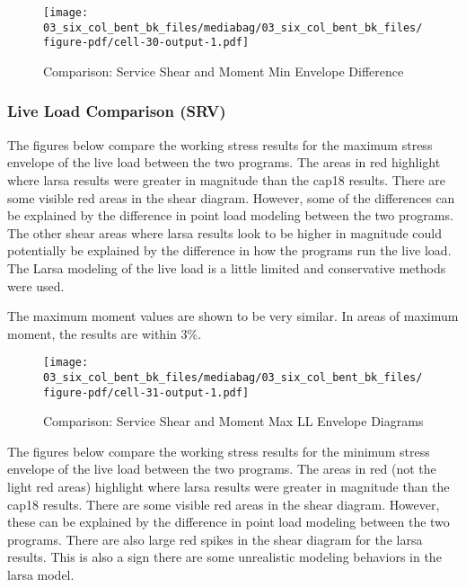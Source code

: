 \documentclass[
  letterpaper,
  DIV=11,
  numbers=noendperiod]{scrartcl}
\begin{document}
\begin{figure}[H]

{\centering \texttt{[image: 03\_six\_col\_bent\_bk\_files/mediabag/03\_six\_col\_bent\_bk\_files/figure-pdf/cell-30-output-1.pdf]}

}

\caption{Comparison: Service Shear and Moment Min Envelope Difference}

\end{figure}%

\newpage{}

\subsubsection{Live Load Comparison
(SRV)}\label{live-load-comparison-srv}

The figures below compare the working stress results for the maximum
stress envelope of the live load between the two programs. The areas in
red highlight where larsa results were greater in magnitude than the
cap18 results. There are some visible red areas in the shear diagram.
However, some of the differences can be explained by the difference in
point load modeling between the two programs. The other shear areas
where larsa results look to be higher in magnitude could potentially be
explained by the difference in how the programs run the live load. The
Larsa modeling of the live load is a little limited and conservative
methods were used.

The maximum moment values are shown to be very similar. In areas of
maximum moment, the results are within 3\%.

\begin{figure}[H]

{\centering \texttt{[image: 03\_six\_col\_bent\_bk\_files/mediabag/03\_six\_col\_bent\_bk\_files/figure-pdf/cell-31-output-1.pdf]}

}

\caption{Comparison: Service Shear and Moment Max LL Envelope Diagrams}

\end{figure}%

\newpage{}

The figures below compare the working stress results for the minimum
stress envelope of the live load between the two programs. The areas in
red (not the light red areas) highlight where larsa results were greater
in magnitude than the cap18 results. There are some visible red areas in
the shear diagram. However, these can be explained by the difference in
point load modeling between the two programs. There are also large red
spikes in the shear diagram for the larsa results. This is also a sign
there are some unrealistic modeling behaviors in the larsa model.
\end{document}
